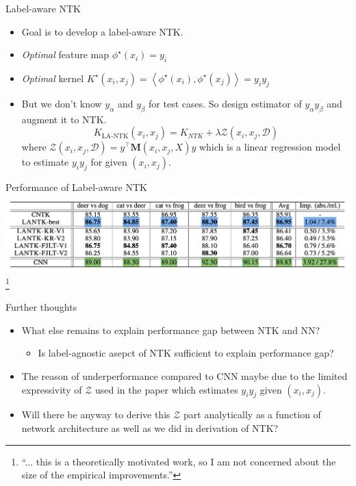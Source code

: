 \documentclass{beamer}
\begin{document}
	\begin{frame}{Label-aware NTK}
		\begin{itemize}
			\item Goal is to develop a label-aware NTK.
			\item \textit{Optimal} feature map $\phi^{\star}(x_i)=y_i$
			\item \textit{Optimal} kernel  
			$
			K^{\star}\left(x_i, x_j\right)=\left\langle\phi^{\star}(x_i), \phi^{\star}(x_j)\right\rangle = y_i y_j
			$
			\item But we don't know $y_\alpha$ and $y_\beta$ for test cases. So design estimator of $y_\alpha y_\beta$ and augment it to NTK.
			$$K_{\text{LA-NTK}}(x_i, x_j)= K_{NTK} + \lambda \mathcal{Z}\left(x_i, x_j, \mathcal{D}\right)$$
			\quad \quad where $\mathcal{Z}\left(x_i, x_j, \mathcal{D}\right)=y^{\top} \mathbf{M}\left(x_i, x_j, X\right) y$ which is a linear regression model to estimate $y_iy_j$ for given $(x_i, x_j)$.
		\end{itemize}
	\end{frame}

	\begin{frame}{Performance of Label-aware NTK}
		\centering	\includegraphics[scale=0.35]{./images/perfrpt.png}\footnote{
			``... this is a theoretically motivated work, so I am not concerned about the size of the empirical improvements.''
		}
	\end{frame}

	\begin{frame}{Further thoughts}
		\begin{itemize}
			\item What else remains to explain performance gap between NTK and NN?
			\begin{itemize}
				\item Is label-agnostic asepct of NTK sufficient to explain performance gap?
			\end{itemize}
			\item The reason of underperformance compared to CNN maybe due to the limited expressivity of $\mathcal{Z}$ used in the paper which estimates $y_iy_j$ given $(x_i, x_j)$.
			\item Will there be anyway to derive this $\mathcal{Z}$ part analytically as a function of network architecture as well as we did in derivation of NTK?
		\end{itemize}
	\end{frame}
\end{document}
